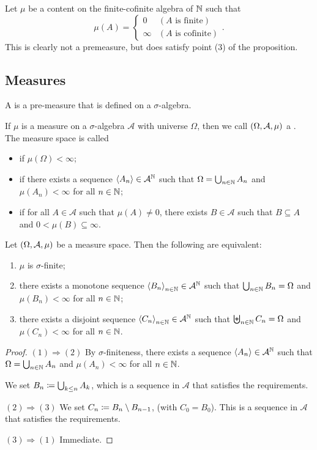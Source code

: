 \begin{example}
Let $\mu$ be a content on the finite-cofinite algebra of $\mathbb{N}$ such that
\[ \mu(A) = \begin{cases}
0 & (\text{$A$ is finite}) \\ \infty & (\text{$A$ is cofinite})
\end{cases}. \]
This is clearly not a premeasure, but does satisfy point (3) of the proposition.
\end{example}

\subsection{Measures}
\begin{definition}
A  is a pre-measure that is defined on a $\sigma$-algebra.

If $\mu$ is a measure on a $\sigma$-algebra $\mathcal{A}$ with universe $\Omega$, then we call $\sSet{\Omega, \mathcal{A}, \mu}$ a . The measure space is called
\begin{itemize}
\item {} if $\mu(\Omega) < \infty$;
\item {} if there exists a sequence $\left\langle A_n \right\rangle\in \mathcal{A}^{\mathbb{N}}$ such that $\Omega = \bigcup_{n\in\mathbb{N}}A_n$ and $\mu(A_n)<\infty$ for all $n\in\mathbb{N}$;
\item {} if for all $A\in \mathcal{A}$ such that $\mu(A) \neq 0$, there exists $B\in \mathcal{A}$ such that $B\subseteq A$ and $0< \mu(B) \subseteq \infty$.
\end{itemize}
\end{definition}

\begin{lemma} \label{sigmaFiniteSequences}
Let $\sSet{\Omega, \mathcal{A}, \mu}$ be a measure space. Then the following are equivalent:
\begin{enumerate}
\item $\mu$ is $\sigma$-finite;
\item there exists a monotone sequence $\left\langle B_n \right\rangle_{n\in \mathbb{N}}\in\mathcal{A}^{\mathbb{N}}$ such that $\bigcup_{n\in\mathbb{N}}B_n = \Omega$ and $\mu(B_n) < \infty$ for all $n\in\mathbb{N}$;
\item there exists a disjoint sequence $\left\langle C_n \right\rangle_{n\in \mathbb{N}}\in\mathcal{A}^{\mathbb{N}}$ such that $\biguplus_{n\in\mathbb{N}}C_n = \Omega$ and $\mu(C_n) < \infty$ for all $n\in\mathbb{N}$.
\end{enumerate}
\end{lemma}
\begin{proof}
$(1) \Rightarrow (2)$ By $\sigma$-finiteness, there exists a sequence $\left\langle A_n \right\rangle\in \mathcal{A}^{\mathbb{N}}$ such that $\Omega = \bigcup_{n\in\mathbb{N}}A_n$ and $\mu(A_n)<\infty$ for all $n\in\mathbb{N}$.

We set $B_n \coloneqq \bigcup_{k\leq n} A_k$, which is a sequence in $\mathcal{A}$ that satisfies the requirements.

$(2) \Rightarrow (3)$ We set $C_n \coloneqq B_n\setminus B_{n-1}$, (with $C_0 = B_0$). This is a sequence in $\mathcal{A}$ that satisfies the requirements.

$(3) \Rightarrow (1)$ Immediate.
\end{proof}

